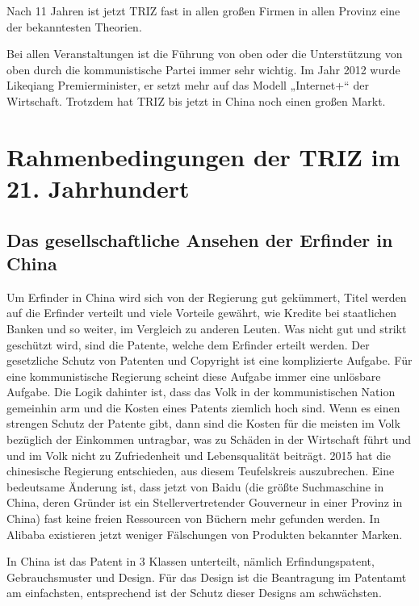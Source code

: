 \documentclass[11pt,a4paper]{article}
\begin{document}
Nach 11 Jahren ist jetzt TRIZ fast in allen großen Firmen in allen Provinz
eine der bekanntesten Theorien.

Bei allen Veranstaltungen ist die Führung von oben oder die Unterstützung von
oben durch die kommunistische Partei immer sehr wichtig. Im Jahr 2012 wurde
Likeqiang Premierminister, er setzt mehr auf das Modell „Internet+“ der
Wirtschaft.  Trotzdem hat TRIZ bis jetzt in China noch einen großen Markt.

\section{Rahmenbedingungen der TRIZ im 21. Jahrhundert}

\subsection{Das gesellschaftliche Ansehen der Erfinder in China}

Um Erfinder in China wird sich von der Regierung gut gekümmert, Titel werden
auf die Erfinder verteilt und viele Vorteile gewährt, wie Kredite bei
staatlichen Banken und so weiter, im Vergleich zu anderen Leuten. Was nicht
gut und strikt geschützt wird, sind die Patente, welche dem Erfinder erteilt
werden. Der gesetzliche Schutz von Patenten und Copyright ist eine
komplizierte Aufgabe. Für eine kommunistische Regierung scheint diese Aufgabe
immer eine unlösbare Aufgabe. Die Logik dahinter ist, dass das Volk in der
kommunistischen Nation gemeinhin arm und die Kosten eines Patents ziemlich
hoch sind. Wenn es einen strengen Schutz der Patente gibt, dann sind die
Kosten für die meisten im Volk bezüglich der Einkommen untragbar, was zu
Schäden in der Wirtschaft führt und und im Volk nicht zu Zufriedenheit und
Lebensqualität beiträgt.  2015 hat die chinesische Regierung entschieden, aus
diesem Teufelskreis auszubrechen. Eine bedeutsame Änderung ist, dass jetzt von
Baidu (die größte Suchmaschine in China, deren Gründer ist ein
Stellervertretender Gouverneur in einer Provinz in China) fast keine freien
Ressourcen von Büchern mehr gefunden werden. In Alibaba existieren jetzt
weniger Fälschungen von Produkten bekannter Marken.

In China ist das Patent in 3 Klassen unterteilt, nämlich Erfindungspatent,
Gebrauchsmuster und Design. Für das Design ist die Beantragung im Patentamt am
einfachsten, entsprechend ist der Schutz dieser Designs am schwächsten.
\end{document}
